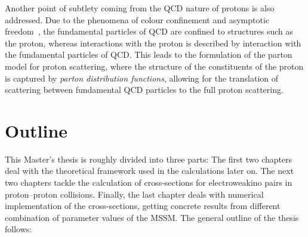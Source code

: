 Another point of subtlety coming from the QCD nature of protons is also addressed.
Due to the phenomena of colour confinement and asymptotic freedom~\cite{Gross:1973id}, the fundamental particles of QCD are confined to structures such as the proton, whereas interactions with the proton is described by interaction with the fundamental particles of QCD\@.
This leads to the formulation of the parton model for proton scattering, where the structure of the constituents of the proton is captured by \emph{parton distribution functions}, allowing for the translation of scattering between fundamental QCD particles to the full proton scattering.



\section*{Outline}
This Master's thesis is roughly divided into three parts:
The first two chapters deal with the theoretical framework used in the calculations later on.
The next two chapters tackle the calculation of cross-sections for electroweakino pairs in proton--proton collisions.
Finally, the last chapter deals with numerical implementation of the cross-sections, getting concrete results from different combination of parameter values of the MSSM\@.
The general outline of the thesis follows:

